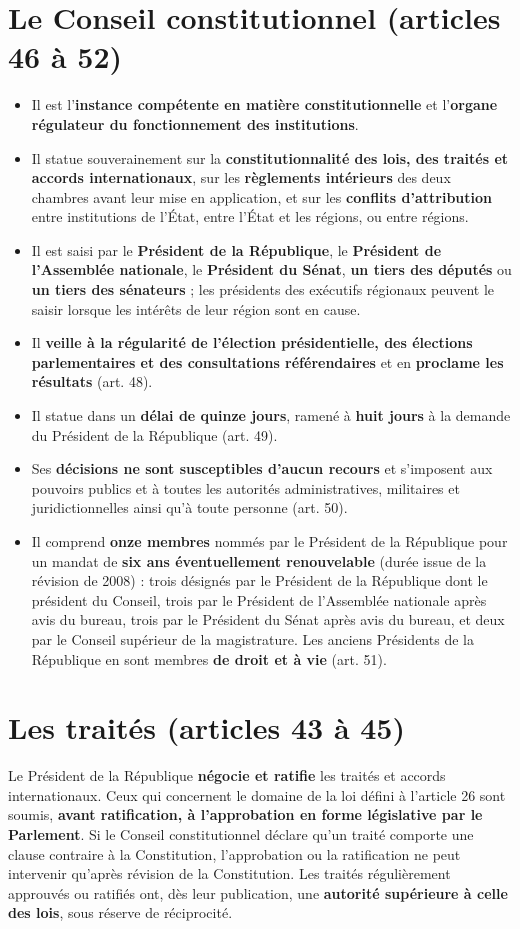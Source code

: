 \documentclass[11pt,a4paper,oneside]{report}
\begin{document}
\section{Le Conseil constitutionnel (articles 46 à 52)}
\begin{itemize}
  \item Il est l'\textbf{instance compétente en matière constitutionnelle} et l'\textbf{organe régulateur du fonctionnement des institutions}.
  \item Il statue souverainement sur la \textbf{constitutionnalité des lois, des traités et accords internationaux}, sur les \textbf{règlements intérieurs} des deux chambres avant leur mise en application, et sur les \textbf{conflits d'attribution} entre institutions de l'État, entre l'État et les régions, ou entre régions.
  \item Il est saisi par le \textbf{Président de la République}, le \textbf{Président de l'Assemblée nationale}, le \textbf{Président du Sénat}, \textbf{un tiers des députés} ou \textbf{un tiers des sénateurs} ; les présidents des exécutifs régionaux peuvent le saisir lorsque les intérêts de leur région sont en cause.
  \item Il \textbf{veille à la régularité de l'élection présidentielle, des élections parlementaires et des consultations référendaires} et en \textbf{proclame les résultats} (art. 48).
  \item Il statue dans un \textbf{délai de quinze jours}, ramené à \textbf{huit jours} à la demande du Président de la République (art. 49).
  \item Ses \textbf{décisions ne sont susceptibles d'aucun recours} et s'imposent aux pouvoirs publics et à toutes les autorités administratives, militaires et juridictionnelles ainsi qu'à toute personne (art. 50).
  \item Il comprend \textbf{onze membres} nommés par le Président de la République pour un mandat de \textbf{six ans éventuellement renouvelable} (durée issue de la révision de 2008) : trois désignés par le Président de la République dont le président du Conseil, trois par le Président de l'Assemblée nationale après avis du bureau, trois par le Président du Sénat après avis du bureau, et deux par le Conseil supérieur de la magistrature. Les anciens Présidents de la République en sont membres \textbf{de droit et à vie} (art. 51).
\end{itemize}
\section{Les traités (articles 43 à 45)}
Le Président de la République \textbf{négocie et ratifie} les traités et accords internationaux. Ceux qui concernent le domaine de la loi défini à l'article 26 sont soumis, \textbf{avant ratification, à l'approbation en forme législative par le Parlement}. Si le Conseil constitutionnel déclare qu'un traité comporte une clause contraire à la Constitution, l'approbation ou la ratification ne peut intervenir qu'après révision de la Constitution. Les traités régulièrement approuvés ou ratifiés ont, dès leur publication, une \textbf{autorité supérieure à celle des lois}, sous réserve de réciprocité.
\end{document}
